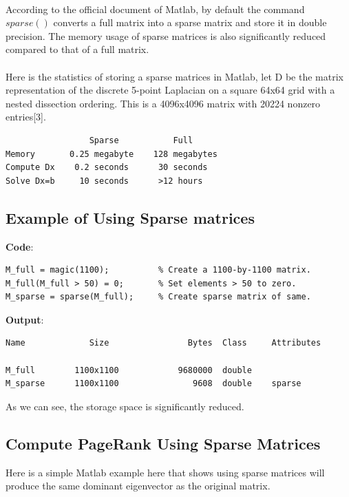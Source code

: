 \documentclass[12pt]{article}
\begin{document}
\paragraph{} According to the official document of Matlab, by default the command $sparse()$ converts a full matrix into a sparse matrix and store it in double precision. The memory usage of sparse matrices is also significantly reduced compared to that of a full matrix.

\paragraph{} Here is the statistics of storing a sparse matrices in Matlab, let D be the matrix representation of the discrete 5-point Laplacian on a square 64x64 grid with a nested dissection ordering. This is a 4096x4096 matrix with 20224 nonzero entries[3].

\begin{verbatim}
                 Sparse           Full
Memory       0.25 megabyte    128 megabytes
Compute Dx    0.2 seconds      30 seconds
Solve Dx=b     10 seconds      >12 hours
\end{verbatim}

\subsection{Example of Using Sparse matrices}
\textbf{Code}:
\begin{verbatim}
M_full = magic(1100);          % Create a 1100-by-1100 matrix.
M_full(M_full > 50) = 0;       % Set elements > 50 to zero.
M_sparse = sparse(M_full);     % Create sparse matrix of same.
\end{verbatim}

\noindent \textbf{Output}:
\begin{verbatim}
Name             Size                Bytes  Class     Attributes

M_full        1100x1100            9680000  double              
M_sparse      1100x1100               9608  double    sparse  
\end{verbatim}

\noindent As we can see, the storage space is significantly reduced.\\

\subsection{Compute PageRank Using Sparse Matrices}
Here is a simple Matlab example here that shows using sparse matrices will produce the same dominant eigenvector as the original matrix.\\
\end{document}
